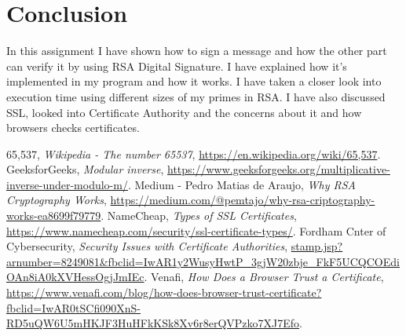 \documentclass[12pt, letterpaper]{article}
\begin{document}
\section*{Conclusion}
In this assignment I have shown how to sign a message and how the other part can verify it by using RSA Digital Signature. I have explained how it's implemented in my program and how it works. I have taken a closer look into execution time using different sizes of my primes in RSA. I have also discussed SSL, looked into Certificate Authority and the concerns about it and how browsers checks certificates. 


\begin{thebibliography}{10} 
 65,537,  \emph{Wikipedia - The number 65537},
\url{https://en.wikipedia.org/wiki/65,537}.
 GeeksforGeeks,  \emph{Modular inverse},
\url{https://www.geeksforgeeks.org/multiplicative-inverse-under-modulo-m/}.
 Medium - Pedro Matias de Araujo,  \emph{Why RSA Cryptography Works},
\url{https://medium.com/@pemtajo/why-rsa-criptography-works-ea8699f79779}.
 NameCheap,  \emph{Types of SSL Certificates},
\url{https://www.namecheap.com/security/ssl-certificate-types/}.
 Fordham Cnter of Cybersecurity,  \emph{Security Issues with Certificate Authorities},
\url{stamp.jsp?arnumber=8249081&fbclid=IwAR1y2WusyHwtP_3gjW20zbje_FkF5UCQCOEdiOAn8iA0kXVHessOgjJmIEc}.
 Venafi,  \emph{How Does a Browser Trust a Certificate},
\url{https://www.venafi.com/blog/how-does-browser-trust-certificate?fbclid=IwAR0tSCfi090XnS-RD5uQW6U5mHKJF3HuHFkKSk8Xv6r8erQVPzko7XJ7Efo}.
\end{thebibliography}
\end{document}

